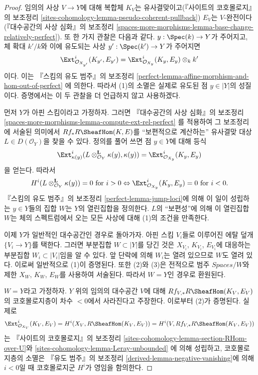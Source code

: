\begin{proof}
임의의 사상 $V \to Y$에 대해 복합체 $K_V$는 유사결맞이고(『사이트의
코호몰로지』의 보조정리
\ref{sites-cohomology-lemma-pseudo-coherent-pullback})
$E_V$는 $V$-완전이다(『대수공간의 사상 심화』의 보조정리
\ref{spaces-more-morphisms-lemma-base-change-relatively-perfect}).
또 한 가지 관찰은 다음과 같다. $y : \Spec(k) \to Y$가 주어지고, 체 확대
$k'/k$와 이에 유도되는 사상 $y' : \Spec(k') \to Y$가 주어지면
$$
\Ext^i_{\mathcal{O}_{X_{y'}}}(K_{y'}, E_{y'}) =
\Ext^i_{\mathcal{O}_{X_y}}(K_y, E_y) \otimes_k k'
$$
이다. 이는 『스킴의 유도 범주』의 보조정리
\ref{perfect-lemma-affine-morphism-and-hom-out-of-perfect}
에 의한다. 따라서 (1)의 소멸은 실제로 유도된 점 $y \in |Y|$의 성질이다.
증명에서는 이 두 관찰을 더 언급하지 않고 사용하겠다.

\medskip\noindent
먼저 $Y$가 아핀 스킴이라고 가정하자. 그러면 『대수공간의 사상 심화』의 보조정리
\ref{spaces-more-morphisms-lemma-compute-ext-rel-perfect}
를 적용하여 그 보조정리에 서술된 의미에서 $Rf_*R\SheafHom(K, E)$를
``보편적으로 계산하는'' 유사결맞 대상 $L \in D(\mathcal{O}_Y)$을 찾을 수
있다. 정의를 풀어 쓰면 점 $y \in Y$에 대해 등식
$$
\Ext^i_{\kappa(y)}(L \otimes_{\mathcal{O}_Y}^\mathbf{L} \kappa(y),
\kappa(y)) = \Ext^i_{\mathcal{O}_{X_y}}(K_y, E_y)
$$
을 얻는다. 따라서
$$
H^i(L \otimes_{\mathcal{O}_Y}^\mathbf{L} \kappa(y)) = 0
\text{ for } i > 0 \Leftrightarrow
\Ext^i_{\mathcal{O}_{X_y}}(K_y, E_y) = 0 \text{ for }i < 0.
$$
『스킴의 유도 범주』의 보조정리 \ref{perfect-lemma-jump-loci}에 의해 이 일이
성립하는 $y \in Y$들의 집합 $W$는 $Y$의 열린집합을 정의한다. $L$의
``보편성''에 의해 이 열린집합 $W$는 체의 스펙트럼에서 오는 모든 사상에 대해
(1)의 조건을 만족한다.

\medskip\noindent
이제 $Y$가 일반적인 대수공간인 경우로 돌아가자. 아핀 스킴 $V_i$들로 이루어진
에탈 덮개 $\{V_i \to Y\}$를 택한다. 그러면 부분집합 $W \subset |Y|$를
당긴 것은 $X_{V_i}$, $K_{V_i}$, $E_{V_i}$에 대응하는 부분집합
$W_i \subset |V_i|$임을 알 수 있다. 앞 단락에 의해 $W_i$는 열려 있으므로
$W$도 열려 있다. 이로써 일반적으로 (1)이 증명된다. 또한 (2)와 (3)은 전적으로
범주 $\textit{Spaces}/W$와 제한 $X_W$, $K_W$, $E_W$를 사용하여 서술된다.
따라서 $W = Y$인 경우로 환원된다.

\medskip\noindent
$W = Y$라고 가정하자. $Y$ 위의 임의의 대수공간 $V$에 대해
$Rf_{V, *}R\SheafHom(K_V, E_V)$의 코호몰로지층이 차수 $< 0$에서 사라진다고
주장한다. 이로부터 (2)가 증명된다. 실제로
$$
\Ext^i_{\mathcal{O}_{X_V}}(K_V, E_V) =
H^i(X_V, R\SheafHom(K_V, E_V)) = 
H^i(V, Rf_{V, *}R\SheafHom(K_V, E_V))
$$
는 『사이트의 코호몰로지』의 보조정리
\ref{sites-cohomology-lemma-section-RHom-over-U}와
\ref{sites-cohomology-lemma-Leray-unbounded}
에 의해 성립하고, 코호몰로지층의 소멸은 『유도 범주』의 보조정리
\ref{derived-lemma-negative-vanishing}에 의해 $i < 0$일 때 코호몰로지군
$H^i$가 영임을 함의한다.


\end{proof}
